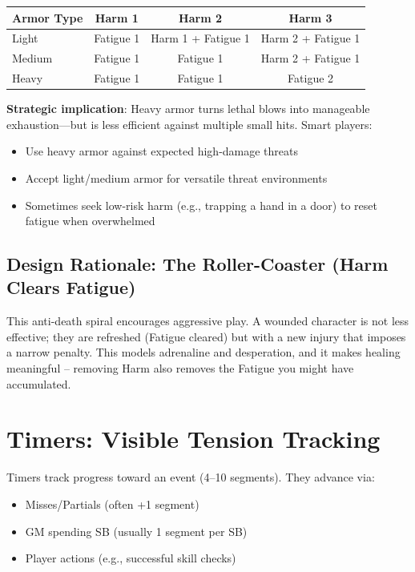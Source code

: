 \documentclass[11pt]{article}
\begin{document}
\begin{table}[h]
\centering
\begin{tabular}{lccc}
\toprule
\textbf{Armor Type} & \textbf{Harm 1} & \textbf{Harm 2} & \textbf{Harm 3} \\
\midrule
Light  & Fatigue 1 & Harm 1 + Fatigue 1 & Harm 2 + Fatigue 1 \\
Medium & Fatigue 1 & Fatigue 1 & Harm 2 + Fatigue 1 \\
Heavy  & Fatigue 1 & Fatigue 1 & Fatigue 2 \\
\bottomrule
\end{tabular}
\end{table}

\textbf{Strategic implication}: Heavy armor turns lethal blows into manageable exhaustion---but is less efficient against multiple small hits. Smart players:
\begin{itemize}
    \item Use heavy armor against expected high-damage threats
    \item Accept light/medium armor for versatile threat environments
    \item Sometimes seek low-risk harm (e.g., trapping a hand in a door) to reset fatigue when overwhelmed
\end{itemize}

\subsection{Design Rationale: The Roller-Coaster (Harm Clears Fatigue)}
This anti-death spiral encourages aggressive play. A wounded character is not less effective; they are refreshed (Fatigue cleared) but with a new injury that imposes a narrow penalty. This models adrenaline and desperation, and it makes healing meaningful -- removing Harm also removes the Fatigue you might have accumulated.

\section{Timers: Visible Tension Tracking}

Timers track progress toward an event (4--10 segments). They advance via:
\begin{itemize}
    \item Misses/Partials (often +1 segment)
    \item GM spending SB (usually 1 segment per SB)
    \item Player actions (e.g., successful skill checks)
\end{itemize}
\end{document}
